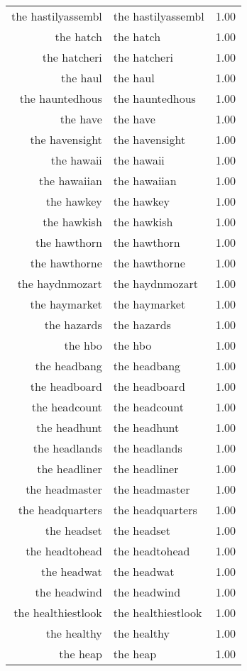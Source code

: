 \begin{table}[ht]
\begin{tabular}{rlr}
  the hastilyassembl & the hastilyassembl & 1.00 \\ 
  the hatch & the hatch & 1.00 \\ 
  the hatcheri & the hatcheri & 1.00 \\ 
  the haul & the haul & 1.00 \\ 
  the hauntedhous & the hauntedhous & 1.00 \\ 
  the have & the have & 1.00 \\ 
  the havensight & the havensight & 1.00 \\ 
  the hawaii & the hawaii & 1.00 \\ 
  the hawaiian & the hawaiian & 1.00 \\ 
  the hawkey & the hawkey & 1.00 \\ 
  the hawkish & the hawkish & 1.00 \\ 
  the hawthorn & the hawthorn & 1.00 \\ 
  the hawthorne & the hawthorne & 1.00 \\ 
  the haydnmozart & the haydnmozart & 1.00 \\ 
  the haymarket & the haymarket & 1.00 \\ 
  the hazards & the hazards & 1.00 \\ 
  the hbo & the hbo & 1.00 \\ 
  the headbang & the headbang & 1.00 \\ 
  the headboard & the headboard & 1.00 \\ 
  the headcount & the headcount & 1.00 \\ 
  the headhunt & the headhunt & 1.00 \\ 
  the headlands & the headlands & 1.00 \\ 
  the headliner & the headliner & 1.00 \\ 
  the headmaster & the headmaster & 1.00 \\ 
  the headquarters & the headquarters & 1.00 \\ 
  the headset & the headset & 1.00 \\ 
  the headtohead & the headtohead & 1.00 \\ 
  the headwat & the headwat & 1.00 \\ 
  the headwind & the headwind & 1.00 \\ 
  the healthiestlook & the healthiestlook & 1.00 \\ 
  the healthy & the healthy & 1.00 \\ 
  the heap & the heap & 1.00 \\ 

\end{tabular}
\end{table}
